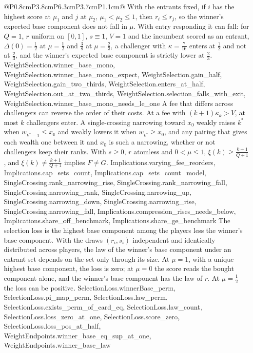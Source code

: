 \begin{longtable}{@{}P{0.8cm}P{3.8cm}P{6.3cm}P{3.7cm}P{1.1cm}@{}}
  {With the entrants fixed, if $i$ has the highest score at $\mu_1$ and $j$ at
  $\mu_2$, $\mu_1<\mu_2\le1$, then $r_i\le r_j$, so the winner's expected base
  component does not fall in $\mu$. With entry responding it can fall: for
  $Q=1$, $r$ uniform on $[0,1]$, $s\equiv1$, $V=1$ and the incumbent scored as
  an entrant, $\Delta(0)=\frac12$ at $\mu=\frac12$ and $\frac38$ at
  $\mu=\frac23$, a challenger with $\kappa=\frac7{16}$ enters at $\frac12$ and
  not at $\frac23$, and the winner's expected base component is strictly lower
  at $\frac23$.}
  {WeightSelection.winner_base_mono, WeightSelection.winner_base_mono_expect, WeightSelection.gain_half, WeightSelection.gain_two_thirds, WeightSelection.enters_at_half, WeightSelection.out_at_two_thirds, WeightSelection.selection_falls_with_exit, WeightSelection.winner_base_mono_needs_le_one}
  {A fee that differs across challengers can reverse the order of their costs.
  At a fee with $(k+1)\kappa_k>V$, at most $k$ challengers enter. A
  single-crossing narrowing toward $x_0$ weakly raises $k^*$ when
  $w_{k^*-1}\le x_0$ and weakly lowers it when $w_{k^*}\ge x_0$, and any pairing
  that gives each wealth one between it and $x_0$ is such a narrowing, whether or
  not challengers keep their ranks. With $s\ge0$,
  $r$ atomless and $0<\mu\le1$, $\xi(k)\ge\frac{k+1}{Q+1}$, and
  $\xi(k)\ne\frac{k+1}{Q+1}$ implies $F\ne G$.}
  {Implications.varying_fee_reorders, Implications.cap_sets_count, Implications.cap_sets_count_model, SingleCrossing.rank_narrowing_rise, SingleCrossing.rank_narrowing_fall, SingleCrossing.narrowing_rank, SingleCrossing.narrowing_up, SingleCrossing.narrowing_down, SingleCrossing.narrowing_rise, SingleCrossing.narrowing_fall, Implications.compression_rises_needs_below, Implications.share_off_benchmark, Implications.share_ge_benchmark}
  {The selection loss is the highest base component among the players less the
  winner's base component. With the draws $(r_i,s_i)$ independent and
  identically distributed across players, the law of the winner's base
  component under an entrant set depends on the set only through its size. At
  $\mu=1$, with a unique highest base component, the loss is zero; at $\mu=0$
  the score reads the bought component alone, and the winner's base component
  has the law of $r$. At $\mu=\frac12$ the loss can be positive.}
  {SelectionLoss.winnerBase_perm, SelectionLoss.pi_map_perm, SelectionLoss.law_perm, SelectionLoss.exists_perm_of_card_eq, SelectionLoss.law_count, SelectionLoss.loss_zero_at_one, SelectionLoss.score_zero, SelectionLoss.loss_pos_at_half, WeightEndpoints.winner_base_eq_sup_at_one, WeightEndpoints.winner_base_law}
\end{longtable}
\normalsize

